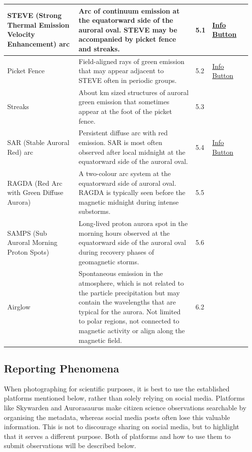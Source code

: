 \documentclass{article}
\begin{document}
\begin{longtable}{|p{1.5cm}|p{6.5cm}|p{1cm}|p{1.75cm}|p{1.8cm}|}
STEVE (Strong Thermal Emission Velocity Enhancement) arc & Arc of continuum emission at the equatorward side of the auroral oval. STEVE may be accompanied by picket fence and streaks. & 5.1 & \href{https://www.taivaanvahti.fi/observations/info/545/en}{Info Button} &  \\
\hline
Picket Fence & Field-aligned rays of green emission that may appear adjacent to STEVE often in periodic groups. & 5.2 & \href{https://www.taivaanvahti.fi/observations/info/961/en}{Info Button} & \textcite{Semeter2020}\\
\hline
Streaks & About km sized structures of auroral green emission that sometimes appear at the foot of the picket fence. & 5.3 &  & \textcite{Semeter2020} \\
\hline
SAR (Stable Auroral Red) arc & Persistent diffuse arc with red emission. SAR is most often observed after local midnight at the equatorward side of the auroral oval. & 5.4 & \href{https://www.taivaanvahti.fi/observations/info/528/en}{Info Button} & \textcite{Hoch1973} \\
\hline
RAGDA (Red Arc with Green Diffuse Aurora) & A two-colour arc system at the equatorward side of auroral oval. RAGDA is typically seen before the magnetic midnight during intense substorms. & 5.5 &  &  \textcite{Nishimura2022}\\
\hline
SAMPS (Sub Auroral Morning Proton Spots) & Long-lived proton aurora spot in the morning hours observed at the equatorward side of the auroral oval during recovery phases of geomagnetic storms. & 5.6 &  & \textcite{Frey2004} \\
\hline

Airglow & Spontaneous emission in the atmosphere, which is not related to the particle precipitation but may contain the wavelengths that are typical for the aurora. Not limited to polar regions, not connected to magnetic activity or align along the magnetic field. & 6.2 &  &  \\
\hline

\end{longtable}


\subsection{Reporting Phenomena}
When photographing for scientific purposes, it is best to use the established platforms mentioned below, rather than solely relying on social media. Platforms like Skywarden and Aurorasaurus make citizen science observations searchable by organising the metadata, whereas social media posts often lose this valuable information. This is not to discourage sharing on social media, but to highlight that it serves a different purpose. Both of platforms and how to use them to submit observations will be described below.
\end{document}

